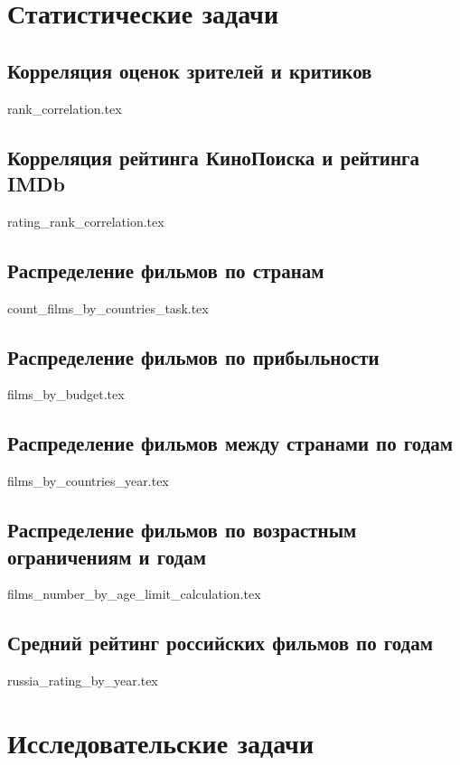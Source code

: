 \documentclass[9pt,conference]{IEEEtran}
\begin{document}
\section{Статистические задачи}
\subsection{Корреляция оценок зрителей и критиков}

{rank_correlation.tex}

\subsection{Корреляция рейтинга КиноПоиска и рейтинга IMDb}

{rating_rank_correlation.tex}

\subsection{Распределение фильмов по странам}

{count_films_by_countries_task.tex}

\subsection{Распределение фильмов по прибыльности}

{films_by_budget.tex}

\subsection{Распределение фильмов между странами по годам}

{films_by_countries_year.tex}

\subsection{Распределение фильмов по возрастным ограничениям и годам}

{films_number_by_age_limit_calculation.tex}

\subsection{Средний рейтинг российских фильмов по годам}

{russia_rating_by_year.tex}

\section{Исследовательские задачи}
\end{document}
